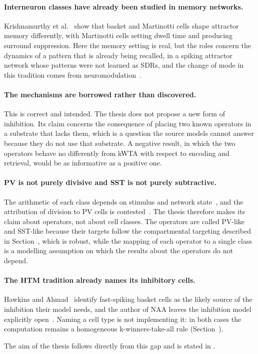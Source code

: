 \paragraph{Interneuron classes have already been studied in memory networks.}
Krishnamurthy et al.~\cite{krishnamurthy2012cortical,krishnamurthy2015longrange}
show that basket and Martinotti cells shape attractor memory differently, with
Martinotti cells setting dwell time and producing surround suppression. Here
the memory setting is real, but the roles concern the dynamics of a pattern
that is already being recalled, in a spiking attractor network whose patterns
were not learned as SDRs, and the change of mode in this tradition comes from
neuromodulation~\cite{fransen1998horizontal}.

\paragraph{The mechanisms are borrowed rather than discovered.}
This is correct and intended. The thesis does not propose a new form of
inhibition. Its claim concerns the consequence of placing two known operators
in a substrate that lacks them, which is a question the source models cannot
answer because they do not use that substrate. A negative result, in which the
two operators behave no differently from kWTA with respect to encoding and
retrieval, would be as informative as a positive one.

\paragraph{PV is not purely divisive and SST is not purely subtractive.}
The arithmetic of each class depends on stimulus and network
state~\cite{elboustani2014response,seybold2015}, and the attribution
of division to PV cells is contested~\cite{lee2012activation,atallah2012parvalbumin}.
The thesis therefore makes its claim about operators, not about cell classes.
The operators are called PV-like and SST-like because their targets follow the
compartmental targeting described in Section~,
which is robust, while the mapping of each operator to a single class is a
modelling assumption on which the results about the operators do not depend.

\paragraph{The HTM tradition already names its inhibitory cells.}
Hawkins and Ahmad~\cite{hawkins2016neurons} identify fast-spiking basket cells as
the likely source of the inhibition their model needs, and the author of NAA
leaves the inhibition model explicitly open~\cite{dobric2024naa}. Naming a cell
type is not implementing it: in both cases the computation remains a
homogeneous k-winners-take-all rule
(Section~).

The aim of the thesis follows directly from this gap and is stated in
\aimref{}.
